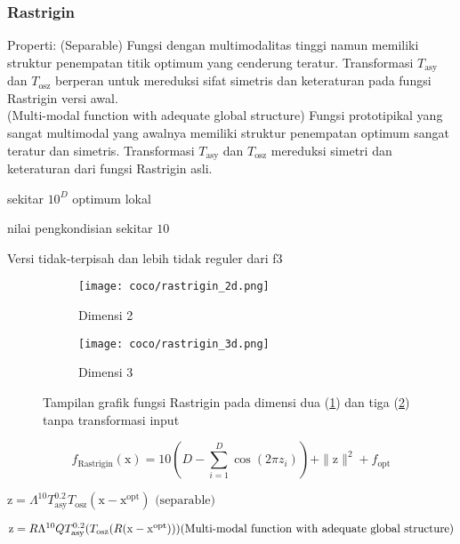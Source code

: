 \subsubsection*{Rastrigin}
\noindent Properti:
(Separable) Fungsi dengan multimodalitas tinggi namun memiliki struktur penempatan titik optimum yang cenderung teratur. Transformasi $T_{\text{asy}}$ dan $T_{\text{osz}}$ berperan untuk mereduksi sifat simetris dan keteraturan pada fungsi Rastrigin versi awal.\\
(Multi-modal function with adequate global structure) Fungsi prototipikal yang sangat multimodal yang awalnya memiliki struktur penempatan optimum sangat teratur dan simetris. Transformasi $T_{\text{asy}}$ dan $T_{\text{osz}}$ mereduksi simetri dan keteraturan dari fungsi Rastrigin asli.
\begin{packed_item}
  \item sekitar $10^D$ optimum lokal
  \item nilai pengkondisian sekitar $10$
  \item Versi tidak-terpisah dan lebih tidak reguler dari f3
\end{packed_item}
\begin{figure}[H]
	\centering
	\begin{subfigure}[b]{0.4\textwidth}
		\centering
		\texttt{[image: coco/rastrigin\_2d.png]}
		\caption{Dimensi 2}
		\label{fig:rastrigin_coco_2d}
	\end{subfigure}
	\hfill
	\begin{subfigure}[b]{0.4\textwidth}
		\centering
		\texttt{[image: coco/rastrigin\_3d.png]}
		\caption{Dimensi 3}
		\label{fig:rastrigin_coco_3d}
	\end{subfigure}
	\caption{Tampilan grafik fungsi Rastrigin pada dimensi dua (\cref{fig:rastrigin_coco_2d}) dan tiga (\cref{fig:rastrigin_coco_3d}) tanpa transformasi input}
	\label{fig:rastrigin_coco}
\end{figure}
\begin{equation}
  f_{\text{Rastrigin}}(\mathrm{x})=10(D-\sum_{i=1}^{D}\cos(2\pi z_i))+\|\mathrm{z}\|^2+f_{\text{opt}}
\end{equation}
\begin{packed_item}
    \item $\mathrm{z}=\Lambda^{10}T_{\text{asy}}^{0.2}T_{\text{osz}}(\mathrm{x}-\mathrm{x}^{\text{opt}})\text{ (separable)}$\\
    \item $\mathrm{z}=R\Lambda^{10}Q T_{\text{asy}}^{0.2}(T_{\text{osz}}(R(\mathrm{x}-\mathrm{x}^{\text{opt}})))\\\text{(Multi-modal function with adequate global structure)}$
\end{packed_item}

